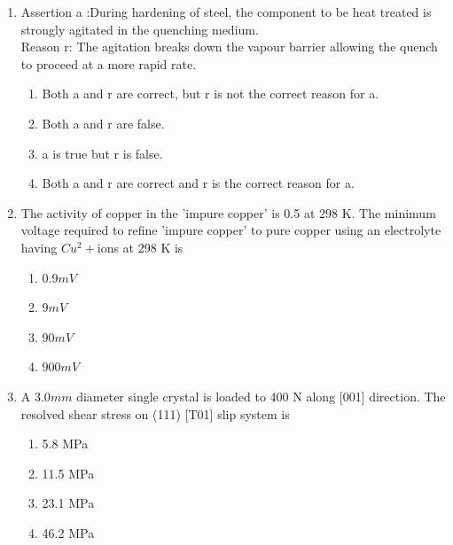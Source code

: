 \documentclass[journal]{IEEEtran}
\theoremstyle{remark}
\begin{document}
\begin{enumerate}
\begin{center}
\end{center}
\begin{multicols}{2}
\begin{enumerate}
    \item P-2, Q-4, R-3, S-1
    \item P-2, Q-1, R-3, S-4
    \item P-3, Q-4, R-1, S-2
    \item P-1, Q-2, R-3, S-4
\end{enumerate}
\end{multicols}
\item Assertion a :During hardening of steel, the component to be heat treated is strongly agitated in the quenching medium.\\
Reason r: The agitation breaks down the vapour barrier allowing the quench to proceed at a more rapid rate.
\hfill{}
\begin{enumerate}
    \item Both a and r are correct, but r is not the correct reason for a.
    \item Both a and r are false.
    \item a is true but r is false.
    \item Both a and r are correct and r is the correct reason for a.
\end{enumerate}



\item The activity of copper in the 'impure copper' is 0.5 at 298 K. The minimum voltage required to refine
'impure copper' to pure copper using an electrolyte having $Cu^2+$ions at 298 K is\hfill{}
\begin{multicols}{4}
\begin{enumerate}
\item $0.9 mV$
\item $9 mV$
\item  $90 mV$
\item  $900 mV$
\end{enumerate}
\end{multicols}

\item  A $3.0 mm$ diameter single crystal is loaded to 400 N along [001] direction. The resolved shear stress on
(111) [T01] slip system is
\hfill{}
\begin{multicols}{4}
\begin{enumerate}
\item  5.8 MPa
\item  11.5 MPa
\item  23.1 MPa
\item 46.2 MPa
\end{enumerate}
\end{multicols}


\end{enumerate}
\end{document}
